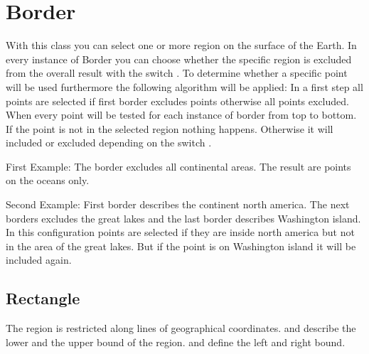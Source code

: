 \clearpage

\section{Border}\label{borderType}
With this class you can select one or more region on the surface of the Earth.
In every instance of Border you can choose whether the specific region is excluded
from the overall result with the switch .
To determine whether a specific point will be used furthermore the following algorithm will be applied:
In a first step all points are selected if first border excludes points otherwise all points excluded.
When every point will be tested for each instance of border from top to bottom.
If the point is not in the selected region nothing happens.
Otherwise it will included or excluded depending on the switch .

First Example: The border excludes all continental areas.
The result are points on the oceans only.

Second Example: First border describes the continent north america. The next borders
excludes the great lakes and the last border describes Washington island.
In this configuration points are selected if they are inside north america
but not in the area of the great lakes. But if the point is on Washington island
it will be included again.


\subsection{Rectangle}
The region is restricted along lines of geographical coordinates.
 and  describe the lower and the upper bound of the region.
 and  define the left and right bound.


